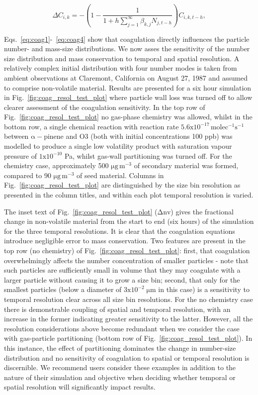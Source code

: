 \documentclass[gmd, manuscript]{copernicus}
\begin{document}
\begin{equation} \label{eq:coag4}
\Delta C_{i,k} = -\left(1-\frac{1}{1+h\sum_{j=1}^{\infty}\beta_{k,j}N_{j,t-h}}\right)C_{i,k,t-h},
\end{equation}

Eqs.~\ref{eq:coag1}-~\ref{eq:coag4} show that coagulation directly influences the particle number- and mass-size distributions.  We now asses the sensitivity of the number size distribution and mass conservation to temporal and spatial resolution.  A relatively complex initial distribution with four number modes is taken from ambient observations at Claremont, California on August 27, 1987 \citep{Jacobson2005} and assumed to comprise non-volatile material.  Results are presented for a six hour simulation in Fig.~\ref{fig:coag_resol_test_plot} where particle wall loss was turned off to allow clearer assessment of the coagulation sensitivity.  In the top row of Fig.~\ref{fig:coag_resol_test_plot} no gas-phase chemistry was allowed, whilst in the bottom row, a single chemical reaction with reaction rate $\mathrm{5.6x10^{-17}\, molec^{-1}s^{-1}}$  between $\mathrm{\alpha-}$pinene and O3 (both with initial concentrations 100 ppb) was modelled to produce a single low volatility product with saturation vapour pressure of $\mathrm{1x10^{-10}}$ Pa, whilst gas-wall partitioning was turned off.  For the chemistry case, approximately 500 $\mathrm{\mu g\, m^{-3}}$ of secondary material was formed, compared to  90 $\mathrm{\mu g\,m^{-3}}$ of seed material.  Columns in Fig.~\ref{fig:coag_resol_test_plot} are distinguished by the size bin resolution as presented in the column titles, and within each plot temporal resolution is varied.

The inset text of Fig.~\ref{fig:coag_resol_test_plot} ($\mathrm{\Delta nv}$) gives the fractional change in non-volatile material from the start to end (six hours) of the simulation for the three temporal resolutions.  It is clear that the coagulation equations introduce negligible error to mass conservation.  Two features are present in the top row (no chemistry) of Fig.~\ref{fig:coag_resol_test_plot}: first, that coagulation overwhelmingly affects the number concentration of smaller particles - note that such particles are sufficiently small in volume that they may coagulate with a larger particle without causing it to grow a size bin; second, that only for the smallest particles (below a diameter of $\mathrm{3x10^{-2}\; \mu m}$ in this case) is a sensitivity to temporal resolution clear across all size bin resolutions.  For the no chemistry case there is demonstrable coupling of spatial and temporal resolution, with an increase in the former indicating greater sensitivity to the latter.  However, all the resolution considerations above become redundant when we consider the case with gas-particle partitioning (bottom row of Fig.~\ref{fig:coag_resol_test_plot}).  In this instance, the effect of partitioning dominates the change in number-size distribution and no sensitivity of coagulation to spatial or temporal resolution is discernible.  We recommend users consider these examples in addition to the nature of their simulation and objective when deciding whether temporal or spatial resolution will significantly impact results.
\end{document}
